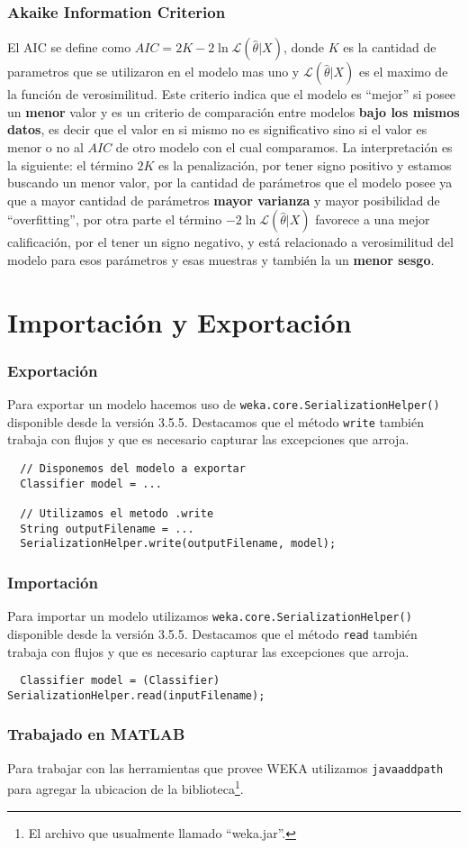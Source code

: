 \documentclass[10pt,a4paper]{article}
\begin{document}
\section{Akaike Information Criterion}\label{modelselection_aic}
El AIC se define como $AIC = 2K - 2\ln{\mathcal{L}(\hat{\theta}|X)}$, donde $K$ es la cantidad de parametros que se utilizaron en el modelo mas uno y $\mathcal{L}(\hat{\theta}|X)$ es el maximo de la función de verosimilitud. Este criterio indica que el modelo es ``mejor'' si posee un \textbf{menor} valor y es un criterio de comparación entre modelos \textbf{bajo los mismos datos}, es decir que el valor en si mismo no es significativo sino si el valor es menor o no al $AIC$ de otro modelo con el cual comparamos. La interpretación es la siguiente: el término $2K$ es la penalización, por tener signo positivo y estamos buscando un menor valor, por la cantidad de parámetros que el modelo posee ya que a mayor cantidad de parámetros \textbf{mayor varianza} y mayor posibilidad de ``overfitting'', por otra parte el término $-2 \ln{\mathcal{L}(\hat{\theta}|X)}$ favorece a una mejor calificación, por el tener un signo negativo, y está relacionado a verosimilitud del modelo para esos parámetros y esas muestras y también la un \textbf{menor sesgo}\cite{Hu07}.


\part{Importación y Exportación}
\section{Exportación}
Para exportar un modelo hacemos uso de \lstinline{weka.core.SerializationHelper()} disponible desde la versión 3.5.5. Destacamos que el método \lstinline{write} también trabaja con flujos y que es necesario capturar las excepciones que arroja.
\begin{lstlisting}
  // Disponemos del modelo a exportar
  Classifier model = ...
  
  // Utilizamos el metodo .write
  String outputFilename = ...
  SerializationHelper.write(outputFilename, model);
\end{lstlisting}

\section{Importación}
Para importar un modelo utilizamos \lstinline{weka.core.SerializationHelper()} disponible desde la versión 3.5.5. Destacamos que el método \lstinline{read} también trabaja con flujos y que es necesario capturar las excepciones que arroja.
\begin{lstlisting}
  Classifier model = (Classifier) SerializationHelper.read(inputFilename);
\end{lstlisting}

\section{Trabajado en MATLAB}
Para trabajar con las herramientas que provee WEKA utilizamos \lstinline{javaaddpath} para agregar la ubicacion de la biblioteca\footnote{El archivo que usualmente llamado ``weka.jar''.}.
\printbibliography
\end{document}
